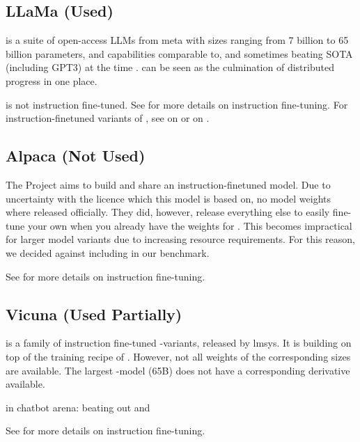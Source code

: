 \subsection{LLaMa (Used)}\label{sub:llama}
 is a suite of open-access \glspl{LLM} from \gls{meta} with sizes ranging from 7 billion to 65 billion parameters, and capabilities comparable to, and sometimes beating \gls{SOTA} (including \gls{GPT3}) at the time \cite{touvron_llama_2023}.  can be seen as the culmination of distributed progress in one place.

 is not instruction fine-tuned. See  for more details on instruction fine-tuning.
For instruction-finetuned variants of , see  on  or  on .

\subsection{Alpaca (Not Used)}\label{sub:alpaca}
The  Project \cite{tatsulab_2023} aims to build and share an instruction-finetuned  model.
Due to uncertainty with the  licence which this model is based on, no model weights where released officially.
They did, however, release everything else to easily fine-tune your own  when you already have the weights for .
This becomes impractical for larger model variants due to increasing resource requirements. For this reason, we decided against including  in our benchmark.

See  for more details on instruction fine-tuning.

\subsection{Vicuna (Used Partially)}\label{sub:vicuna}
 is a family of instruction fine-tuned -variants, released by \gls{lmsys}. It is building on top of the training recipe of .
However, not all weights of the corresponding  sizes are available.
The largest -model (65B) does not have a corresponding  derivative available.

in chatbot arena: beating out  and  \cite{zheng_judging_2023}

See  for more details on instruction fine-tuning.

